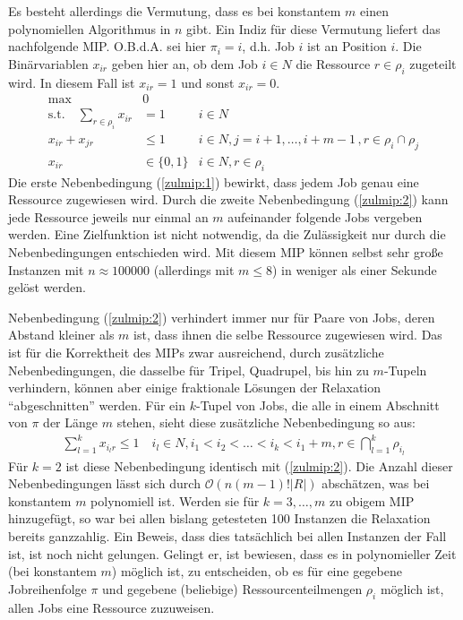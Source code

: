 \documentclass{scrreprt}
\begin{document}
Es besteht allerdings die Vermutung, dass es bei konstantem $m$ einen polynomiellen Algorithmus in $n$ gibt. Ein Indiz für diese Vermutung liefert das nachfolgende MIP.
O.B.d.A. sei hier $\pi_i=i$, d.h. Job $i$ ist an Position $i$.
Die Binärvariablen $x_{ir}$ geben hier an, ob dem Job $i\in N$ die Ressource $r\in\rho_i$ zugeteilt wird.
In diesem Fall ist $x_{ir}=1$ und sonst $x_{ir}=0$.
\begin{align}
    \text{max} \quad &0 \label{zulmip:obj} \\
    \text{s.t.}\quad \sum_{r\in\rho_i} x_{ir} &= 1 & i\in N \label{zulmip:1} \\
    x_{ir} + x_{jr} &\leq 1 & i\in N, j=i+1,\ldots,i+m-1 \, ,r\in\rho_i\cap\rho_j \label{zulmip:2} \\
    x_{ir} &\in \{0,1\} & i\in N, r\in\rho_i
\end{align}
Die erste Nebenbedingung (\ref{zulmip:1}) bewirkt, dass jedem Job genau eine Ressource zugewiesen wird.
Durch die zweite Nebenbedingung (\ref{zulmip:2}) kann jede Ressource jeweils nur einmal an $m$ aufeinander folgende Jobs vergeben werden.
Eine Zielfunktion ist nicht notwendig, da die Zulässigkeit nur durch die Nebenbedingungen entschieden wird.
Mit diesem MIP können selbst sehr große Instanzen mit $n\approx 100000$ (allerdings mit $m\leq 8$) in weniger als einer Sekunde gelöst werden.

Nebenbedingung (\ref{zulmip:2}) verhindert immer nur für Paare von Jobs, deren Abstand kleiner als $m$ ist, dass ihnen die selbe Ressource zugewiesen wird.
Das ist für die Korrektheit des MIPs zwar ausreichend, durch zusätzliche Nebenbedingungen, die dasselbe für Tripel, Quadrupel, bis hin zu $m$-Tupeln verhindern,
können aber einige fraktionale Lösungen der Relaxation "`abgeschnitten"' werden.
Für ein $k$-Tupel von Jobs, die alle in einem Abschnitt von $\pi$ der Länge $m$ stehen, sieht diese zusätzliche Nebenbedingung so aus:
\begin{align}
    \sum_{l=1}^k x_{i_lr} \leq 1 \quad i_l\in N, i_1<i_2<\ldots<i_k<i_1+m, r\in\bigcap_{l=1}^k \rho_{i_l}
\end{align}
Für $k=2$ ist diese Nebenbedingung identisch mit (\ref{zulmip:2}).
Die Anzahl dieser Nebenbedingungen lässt sich durch $\mathcal{O}(n(m-1)!|R|)$ abschätzen, was bei konstantem $m$ polynomiell ist.
Werden sie für $k=3,\ldots,m$ zu obigem MIP hinzugefügt, so war bei allen bislang getesteten 100 Instanzen die Relaxation bereits ganzzahlig.
Ein Beweis, dass dies tatsächlich bei allen Instanzen der Fall ist, ist noch nicht gelungen.
Gelingt er, ist bewiesen, dass es in polynomieller Zeit (bei konstantem $m$) möglich ist, zu entscheiden, ob es für eine gegebene Jobreihenfolge $\pi$ und 
gegebene (beliebige) Ressourcenteilmengen $\rho_i$ möglich ist, allen Jobs eine Ressource zuzuweisen.
\end{document}
